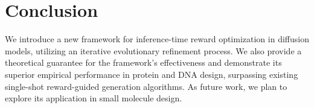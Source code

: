 \section{Conclusion}
We introduce a new framework for inference-time reward optimization in diffusion models, utilizing an iterative evolutionary refinement process. We also provide a theoretical guarantee for the framework's effectiveness and demonstrate its superior empirical performance in protein and DNA design, surpassing existing single-shot reward-guided generation algorithms. As future work, we plan to explore its application in small molecule design.
